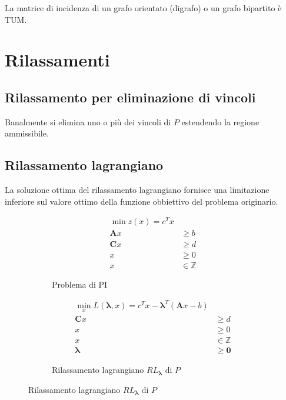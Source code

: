 \documentclass[\main/main.tex]{subfiles}
\begin{document}
\begin{theorem}
  La matrice di incidenza di un grafo orientato (digrafo) o un grafo bipartito è TUM.
\end{theorem}

\section{Rilassamenti}
\subsection{Rilassamento per eliminazione di vincoli}
Banalmente si elimina uno o più dei vincoli di $P$ estendendo la regione ammissibile.

\subsection{Rilassamento lagrangiano}
La soluzione ottima del rilassamento lagrangiano fornisce una limitazione inferiore sul valore ottimo della funzione obbiettivo del problema originario.

\begin{figure}
  \begin{subfigure}{0.49\textwidth}
    \begin{align*}
      \min z(x) = c^Tx         \\
      \bm{A}x & \geq b         \\
      \bm{C}x & \geq d         \\
      x       & \geq 0         \\
      x       & \in \mathbb{Z}
    \end{align*}
    \caption{Problema di PI}
  \end{subfigure}
  \begin{subfigure}{0.49\textwidth}
    \begin{align*}
      \min_x L(\bm{\lambda}, x) = c^Tx -\bm{\lambda}^T(\bm{A}x-b) \\
      \bm{C}x      & \geq d                                       \\
      x            & \geq 0                                       \\
      x            & \in \mathbb{Z}                               \\
      \bm{\lambda} & \geq \bm{0}
    \end{align*}
    \caption{Rilassamento lagrangiano $RL_{\bm{\lambda}}$ di $P$}
  \end{subfigure}
\end{figure}
\end{document}

